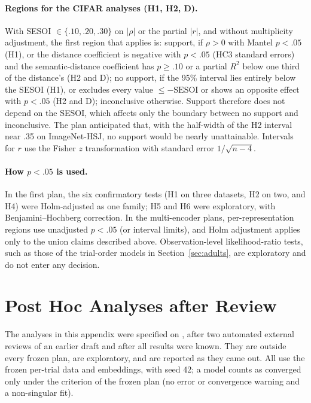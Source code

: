 \paragraph{Regions for the CIFAR analyses (H1, H2, D).} With SESOI $\in \{.10, .20, .30\}$ on $|\rho|$ or the partial $|r|$, and without multiplicity adjustment, the first region that applies is: support, if $\rho > 0$ with Mantel $p < .05$ (H1), or the distance coefficient is negative with $p < .05$ (HC3 standard errors) and the semantic-distance coefficient has $p \geq .10$ or a partial $R^2$ below one third of the distance's (H2 and D); no support, if the 95\% interval lies entirely below the SESOI (H1), or excludes every value $\leq -\mathrm{SESOI}$ or shows an opposite effect with $p < .05$ (H2 and D); inconclusive otherwise. Support therefore does not depend on the SESOI, which affects only the boundary between no support and inconclusive. The plan anticipated that, with the half-width of the H2 interval near .35 on ImageNet-HSJ, no support would be nearly unattainable. Intervals for $r$ use the Fisher $z$ transformation with standard error $1/\sqrt{n - 4}$.

\paragraph{How $p < .05$ is used.} In the first plan, the six confirmatory tests (H1 on three datasets, H2 on two, and H4) were Holm-adjusted as one family; H5 and H6 were exploratory, with Benjamini--Hochberg correction. In the multi-encoder plans, per-representation regions use unadjusted $p < .05$ (or interval limits), and Holm adjustment applies only to the union claims described above. Observation-level likelihood-ratio tests, such as those of the trial-order models in Section~\ref{sec:adults}, are exploratory and do not enter any decision.

\clearpage
\section{Post Hoc Analyses after Review}
\label{app:posthoc}

The analyses in this appendix were specified on \VcPosthocDate, after two automated external reviews of an earlier draft and after all results were known. They are outside every frozen plan, are exploratory, and are reported as they came out. All use the frozen per-trial data and embeddings, with seed 42; a model counts as converged only under the criterion of the frozen plan (no error or convergence warning and a non-singular fit).


